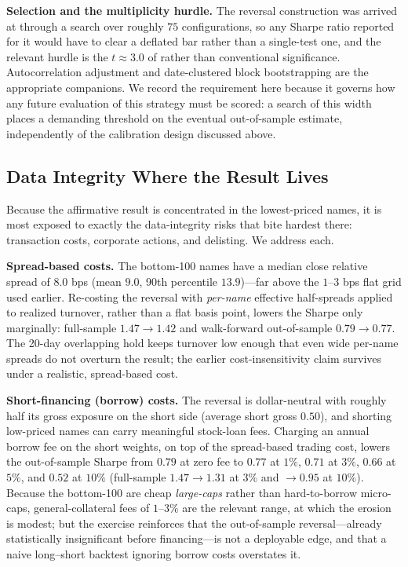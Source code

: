 \documentclass[11pt]{article}
\begin{document}
\textbf{Selection and the multiplicity hurdle.} The reversal construction was arrived at through a search over roughly $75$ configurations, so any Sharpe ratio reported for it would have to clear a deflated bar \citep{bailey2014} rather than a single-test one, and the relevant hurdle is the $t\approx3.0$ of \citet{harvey2016} rather than conventional significance. Autocorrelation adjustment \citep{lo2002} and date-clustered block bootstrapping are the appropriate companions. We record the requirement here because it governs how any future evaluation of this strategy must be scored: a search of this width places a demanding threshold on the eventual out-of-sample estimate, independently of the calibration design discussed above.

\subsection{Data Integrity Where the Result Lives}
\label{sec:integrity}
Because the affirmative result is concentrated in the lowest-priced names, it is most exposed to exactly the data-integrity risks that bite hardest there: transaction costs, corporate actions, and delisting. We address each.

\textbf{Spread-based costs.} The bottom-100 names have a median close relative spread of $8.0$ bps (mean $9.0$, 90th percentile $13.9$)---far above the $1$--$3$ bps flat grid used earlier. Re-costing the reversal with \emph{per-name} effective half-spreads applied to realized turnover, rather than a flat basis point, lowers the Sharpe only marginally: full-sample $1.47\to1.42$ and walk-forward out-of-sample $0.79\to0.77$. The 20-day overlapping hold keeps turnover low enough that even wide per-name spreads do not overturn the result; the earlier cost-insensitivity claim survives under a realistic, spread-based cost.

\textbf{Short-financing (borrow) costs.} The reversal is dollar-neutral with roughly half its gross exposure on the short side (average short gross $0.50$), and shorting low-priced names can carry meaningful stock-loan fees. Charging an annual borrow fee on the short weights, on top of the spread-based trading cost, lowers the out-of-sample Sharpe from $0.79$ at zero fee to $0.77$ at $1\%$, $0.71$ at $3\%$, $0.66$ at $5\%$, and $0.52$ at $10\%$ (full-sample $1.47\to1.31$ at $3\%$ and $\to0.95$ at $10\%$). Because the bottom-100 are cheap \emph{large-caps} rather than hard-to-borrow micro-caps, general-collateral fees of $1$--$3\%$ are the relevant range, at which the erosion is modest; but the exercise reinforces that the out-of-sample reversal---already statistically insignificant before financing---is not a deployable edge, and that a naive long--short backtest ignoring borrow costs overstates it.
\end{document}
